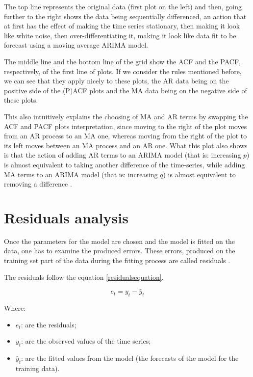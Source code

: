 \documentclass[12pt,a4paper,titlepage]{report}
\begin{document}
The top line represents the original data (first plot on the left) and then, going further to the right shows the data being sequentially differenced, an action that at first has the effect of making the time series stationary, then making it look like white noise, then over-differentiating it, making it look like data fit to be forecast using a moving average ARIMA model.

The middle line and the bottom line of the grid show the ACF and the PACF, respectively, of the first line of plots. If we consider the rules mentioned before, we can see that they apply nicely to these plots, the AR data being on the positive side of the (P)ACF plots and the MA data being on the negative side of these plots.

This also intuitively explains the choosing of MA and AR terms by swapping the ACF and PACF plots interpretation, since moving to the right of the plot moves from an AR process to an MA one, whereas moving from the right of the plot to its left moves between an MA process and an AR one. What this plot also shows is that the action of adding AR terms to an ARIMA model (that is: increasing $ p $) is almost equivalent to taking another difference of the time-series, while adding MA terms to an ARIMA model (that is: increasing $ q $) is almost equivalent to removing a difference \cite{nauarimaarmarules}.

\section{Residuals analysis}

Once the parameters for the model are chosen and the model is fitted on the data, one has to examine the produced errors. These errors, produced on the training set part of the data during the fitting process are called residuals \cite{boxjenkins}.

The residuals follow the equation \ref{residualsequation}.

\begin{equation}
e_{t} = y_{t}-\hat{y}_{t}
\label{residualsequation}
\end{equation}

Where:
\begin{itemize}
    \item $ e_{t}$: are the residuals;
    \item $ y_{t}$: are the observed values of the time series;
    \item $ \hat{y}_{t}$: are the fitted values from the model (the forecasts of the model for the training data).
\end{itemize}
\end{document}
